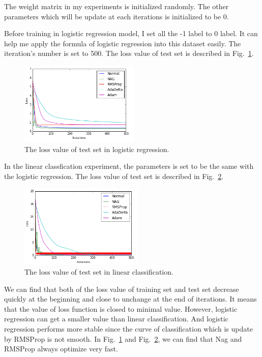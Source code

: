 \documentclass[journal, a4paper]{IEEEtran}
\begin{document}
The weight matrix in my experiments is initialized randomly. The other parameters which will be update at each iterations is initialized to be 0.

Before training in logistic regression model, I set all the -1 label to 0 label. It can help me apply the formula of logistic regression into this dataset easily. The iteration's number is set to 500. The loss value of test set is described in Fig.~\ref{fig_1}.
\begin{figure}[htbp]
\centerline{\includegraphics[height=150px]{line_1.png}}
\caption{The loss value of test set in logistic regression.}
\label{fig_1}
\end{figure}

In the linear classfication experiment, the parameters is set to be the same with the logistic regression. The loss value of test set is described in Fig.~\ref{fig_2}.

\begin{figure}[htbp]
\centerline{\includegraphics[height=150px]{line_2.png}}
\caption{The loss value of test set in linear classification.}
\label{fig_2}
\end{figure}

We can find that both of the loss value of training set and test set decrease quickly at the beginning and close to unchange at the end of iterations. It means that the value of loss function is closed to minimal value. However, logistic regression can get a smaller value than linear classification. And logistic regression performs more stable since the curve of classification which is update by RMSProp is not smooth. In Fig.~\ref{fig_1} and Fig.~\ref{fig_2}, we can find that Nag and RMSProp always optimize very fast.
\end{document}
